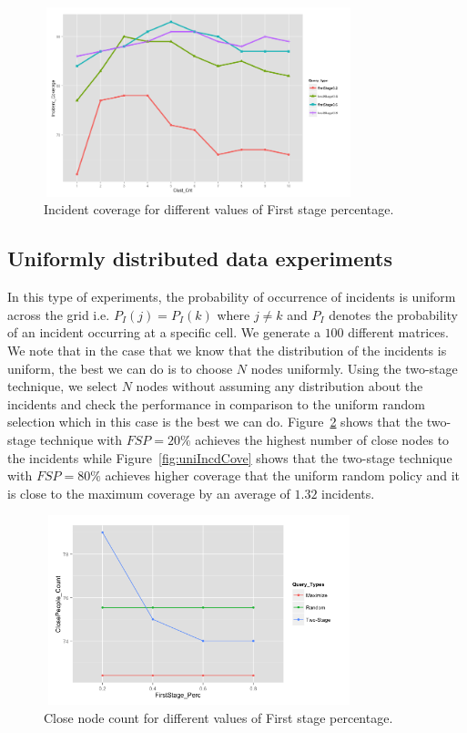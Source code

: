 \documentclass{acm_proc_article-sp}
\begin{document}
\begin{figure}[!h]
\centering
\includegraphics[width=9cm ,height=5.5cm]{figuresPng/Coverage_Result.png}
\caption{Incident coverage for different values of First stage percentage. }
\label{fig: clustCoverage}
\end{figure}
\subsection{Uniformly distributed data experiments}
In this type of experiments, the probability of occurrence of incidents is uniform across the grid i.e. $P_I (j) = P_I (k)$ where $j \neq k$ and $P_I$ denotes the probability of an incident occurring at a specific cell. We generate a $100$ different matrices. We note that in the case that we know that the distribution of the incidents is uniform, the best we can do is to choose $N$ nodes uniformly. Using the two-stage technique, we select $N$ nodes without assuming any distribution about the incidents and check the performance in comparison to the uniform random selection which in this case is the best we can do. Figure~\ref{fig:uniClosePeople} shows that the two-stage technique with $FSP = 20\%$ achieves the highest number of close nodes to the incidents while Figure~\ref{fig:uniIncdCove} shows that the two-stage technique with $FSP = 80\%$ achieves higher coverage that the uniform random policy and it is close to the maximum coverage by an average of $1.32$ incidents.
\begin{figure}[!h]
\centering
\includegraphics[width=9cm ,height=5.5cm]{figuresPng/Uni_ClosePeople_Count.png}
\caption{Close node count for different values of First stage percentage. }
\label{fig:uniClosePeople}
\end{figure}
\end{document}
